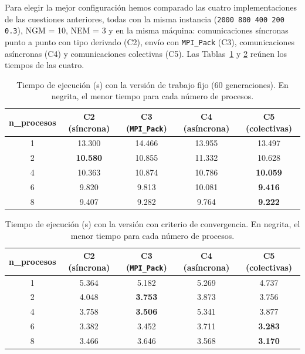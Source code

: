 \documentclass[12pt]{article}
\begin{document}
\begin{enumerate}

Para elegir la mejor configuración hemos comparado las cuatro implementaciones de las cuestiones anteriores, todas con la misma instancia (\texttt{2000 800 400 200 0.3}), NGM = 10, NEM = 3 y en la misma máquina: comunicaciones síncronas punto a punto con tipo derivado (C2), envío con \texttt{MPI\_Pack} (C3), comunicaciones asíncronas (C4) y comunicaciones colectivas (C5). Las Tablas~\ref{tab:c6_fijo} y \ref{tab:c6_conv} reúnen los tiempos de las cuatro.

\begin{table}[htbp]
\centering
\begin{tabular}{c|cccc}
\toprule
\textbf{n\_procesos} & \textbf{C2 (síncrona)} & \textbf{C3 (\texttt{MPI\_Pack})} & \textbf{C4 (asíncrona)} & \textbf{C5 (colectivas)} \\
\midrule
1 & 13.300 & 14.466 & 13.955 & 13.497 \\
2 & \textbf{10.580} & 10.855 & 11.332 & 10.628 \\
4 & 10.363 & 10.874 & 10.786 & \textbf{10.059} \\
6 & 9.820 & 9.813 & 10.081 & \textbf{9.416} \\
8 & 9.407 & 9.282 & 9.764 & \textbf{9.222} \\
\bottomrule
\end{tabular}
\caption{Tiempo de ejecución (s) con la versión de trabajo fijo (60 generaciones). En negrita, el menor tiempo para cada número de procesos.}
\label{tab:c6_fijo}
\end{table}

\begin{table}[htbp]
\centering
\begin{tabular}{c|cccc}
\toprule
\textbf{n\_procesos} & \textbf{C2 (síncrona)} & \textbf{C3 (\texttt{MPI\_Pack})} & \textbf{C4 (asíncrona)} & \textbf{C5 (colectivas)} \\
\midrule
1 & 5.364 & 5.182 & 5.269 & 4.737 \\
2 & 4.048 & \textbf{3.753} & 3.873 & 3.756 \\
4 & 3.758 & \textbf{3.506} & 5.341 & 3.877 \\
6 & 3.382 & 3.452 & 3.711 & \textbf{3.283} \\
8 & 3.466 & 3.646 & 3.568 & \textbf{3.170} \\
\bottomrule
\end{tabular}
\caption{Tiempo de ejecución (s) con la versión con criterio de convergencia. En negrita, el menor tiempo para cada número de procesos.}
\label{tab:c6_conv}
\end{table}


\end{enumerate}
\end{document}
